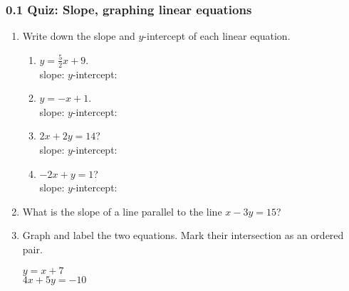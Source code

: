 \documentclass[12pt, twoside]{article}
\begin{document}
\subsubsection*{0.1 Quiz: Slope, graphing linear equations}
  \begin{enumerate}

  \item Write down the slope and $y$-intercept of each linear equation.
  \begin{enumerate}
    \item $y=\frac{5}{2} x+9$. \\[1cm]
      slope: \hspace{6cm} $y$-intercept: \\[0.5cm]
    \item $y=-x+1$. \\[1cm]
      slope: \hspace{6cm} $y$-intercept: \\[0.5cm]
    \item $2x+2y=14$? \\[4cm]
      slope: \hspace{6cm} $y$-intercept: \\[0.5cm]
    \item $-2x+y=1$? \\[4cm]
      slope: \hspace{6cm} $y$-intercept: \\[0.5cm]
  \end{enumerate}

  \item What is the slope of a line parallel to the line $x-3y=15$?  
  \vspace{1.5cm}


\newpage
  \item Graph and label the two equations. Mark their intersection as an ordered pair.
    \begin{multicols}{2}
      $y = x+7$ \\
      $4x+5y=-10$
    \end{multicols}     \vspace{4cm}


    \begin{center} %
    \end{center}

\end{enumerate}
\end{document}

